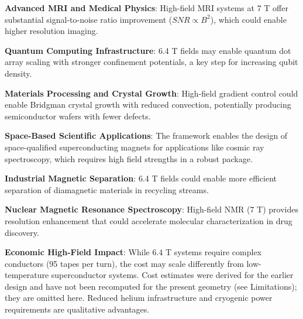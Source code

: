 \documentclass[aps,prb,preprint,amsmath,amssymb]{revtex4-2}
\begin{document}
\textbf{Advanced MRI and Medical Physics}: High-field MRI systems at 7 T offer substantial signal-to-noise ratio improvement ($SNR \propto B^2$), which could enable higher resolution imaging.

\textbf{Quantum Computing Infrastructure}: 6.4 T fields may enable quantum dot array scaling with stronger confinement potentials, a key step for increasing qubit density.

\textbf{Materials Processing and Crystal Growth}: High-field gradient control could enable Bridgman crystal growth with reduced convection, potentially producing semiconductor wafers with fewer defects.

\textbf{Space-Based Scientific Applications}: The framework enables the design of space-qualified superconducting magnets for applications like cosmic ray spectroscopy, which requires high field strengths in a robust package.

\textbf{Industrial Magnetic Separation}: 6.4 T fields could enable more efficient separation of diamagnetic materials in recycling streams.

\textbf{Nuclear Magnetic Resonance Spectroscopy}: High-field NMR (7 T) provides resolution enhancement that could accelerate molecular characterization in drug discovery.

\textbf{Economic High-Field Impact}: While 6.4 T systems require complex conductors (95 tapes per turn), the cost may scale differently from low-temperature superconductor systems. Cost estimates were derived for the earlier design and have not been recomputed for the present geometry (see Limitations); they are omitted here. Reduced helium infrastructure and cryogenic power requirements are qualitative advantages.
\end{document}
